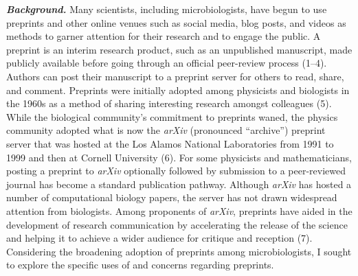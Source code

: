 \documentclass[11pt,]{article}
\begin{document}
\textbf{\emph{Background.}} Many scientists, including microbiologists,
have begun to use preprints and other online venues such as social
media, blog posts, and videos as methods to garner attention for their
research and to engage the public. A preprint is an interim research
product, such as an unpublished manuscript, made publicly available
before going through an official peer-review process (1--4). Authors can
post their manuscript to a preprint server for others to read, share,
and comment. Preprints were initially adopted among physicists and
biologists in the 1960s as a method of sharing interesting research
amongst colleagues (5). While the biological community's commitment to
preprints waned, the physics community adopted what is now the
\emph{arXiv} (pronounced ``archive'') preprint server that was hosted at
the Los Alamos National Laboratories from 1991 to 1999 and then at
Cornell University (6). For some physicists and mathematicians, posting
a preprint to \emph{arXiv} optionally followed by submission to a
peer-reviewed journal has become a standard publication pathway.
Although \emph{arXiv} has hosted a number of computational biology
papers, the server has not drawn widespread attention from biologists.
Among proponents of \emph{arXiv}, preprints have aided in the
development of research communication by accelerating the release of the
science and helping it to achieve a wider audience for critique and
reception (7). Considering the broadening adoption of preprints among
microbiologists, I sought to explore the specific uses of and concerns
regarding preprints.
\end{document}
